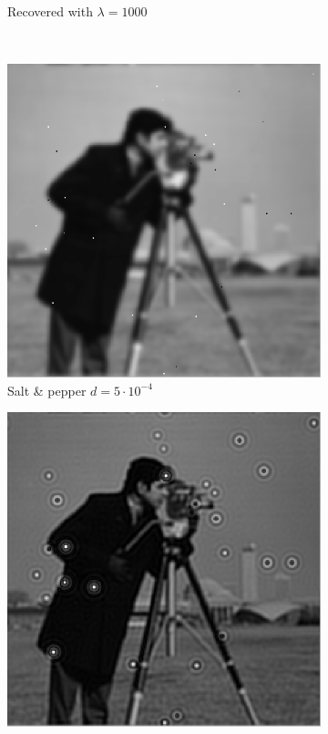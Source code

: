 \documentclass[a4paper, 10pt, conference] {article}
\begin{document}
\begin{figure}[H]
\begin{subfigure}{0.49\textwidth}
		\caption{Recovered with $\lambda = 1000$}
	\end{subfigure}\\
	\begin{subfigure}{0.49\textwidth} 
		\centering						
		\includegraphics[scale=0.48]{gaussian/noisy/saltpepper0005.PNG}
		\caption{Salt \& pepper $d =5\cdot 10^{-4}$}
	\end{subfigure}
	\begin{subfigure}{0.49\textwidth} 
		\centering						
		\includegraphics[scale=0.48]{gaussian/noisy/recovered_saltpepper0005.PNG}

\end{subfigure}
\end{figure}
\end{document}
